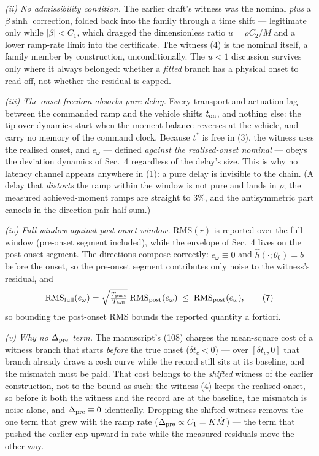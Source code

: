 \documentclass[10pt]{article}
\newcommand{\Mdot}{\dot M}
\newcommand{\rbar}{\bar\rho}
\newcommand{\rms}{\mathrm{RMS}}
\begin{document}
\emph{(ii) No admissibility condition.} The earlier draft's witness
was the nominal \emph{plus} a $\beta\sinh$ correction, folded back
into the family through a time shift --- legitimate only while
$|\beta| < C_1$, which dragged the dimensionless ratio
$u = \rbar C_2/\Mdot$ and a lower ramp-rate limit into the
certificate. The witness (4) is the nominal itself, a family member
by construction, unconditionally. The $u < 1$ discussion survives
only where it always belonged: whether a \emph{fitted} branch has a
physical onset to read off, not whether the residual is capped.

\emph{(iii) The onset freedom absorbs pure delay.} Every transport
and actuation lag between the commanded ramp and the vehicle shifts
$t_{\rm on}$, and nothing else: the tip-over dynamics start when the
moment balance reverses at the vehicle, and carry no memory of the
command clock. Because $t^*$ is free in (3), the witness uses the
realised onset, and $e_\omega$ --- defined \emph{against the
realised-onset nominal} --- obeys the deviation dynamics of Sec.~4
regardless of the delay's size. This is why no latency channel
appears anywhere in (1): a pure delay is invisible to the chain. (A
delay that \emph{distorts} the ramp within the window is not pure
and lands in $\rho$; the measured achieved-moment ramps are straight
to $3\%$, and the antisymmetric part cancels in the direction-pair
half-sum.)

\emph{(iv) Full window against post-onset window.} $\rms(r)$ is
reported over the full window (pre-onset segment included), while
the envelope of Sec.~4 lives on the post-onset segment. The
directions compose correctly: $e_\omega \equiv 0$ and
$\hat h(\cdot;\theta_0) = b$ before the onset, so the pre-onset
segment contributes only noise to the witness's residual, and
\begin{equation}
  \rms_{\rm full}(e_\omega)
  = \sqrt{\tfrac{T_{\rm post}}{T_{\rm full}}}\;
    \rms_{\rm post}(e_\omega)
  \;\le\; \rms_{\rm post}(e_\omega) ,
  \tag{7}
\end{equation}
so bounding the post-onset RMS bounds the reported quantity a
fortiori.

\emph{(v) Why no $\Delta_{\rm pre}$ term.} The manuscript's (108)
charges the mean-square cost of a witness branch that starts
\emph{before} the true onset ($\delta t_c < 0$) --- over
$[\delta t_c, 0]$ that branch already draws a cosh curve while the
record still sits at its baseline, and the mismatch must be paid.
That cost belongs to the \emph{shifted} witness of the earlier
construction, not to the bound as such: the witness (4) keeps the
realised onset, so before it both the witness and the record are at
the baseline, the mismatch is noise alone, and
$\Delta_{\rm pre} \equiv 0$ identically. Dropping the shifted
witness removes the one term that grew with the ramp rate
($\Delta_{\rm pre} \propto C_1 = K\Mdot$) --- the term that pushed
the earlier cap upward in rate while the measured residuals move the
other way.
\end{document}
